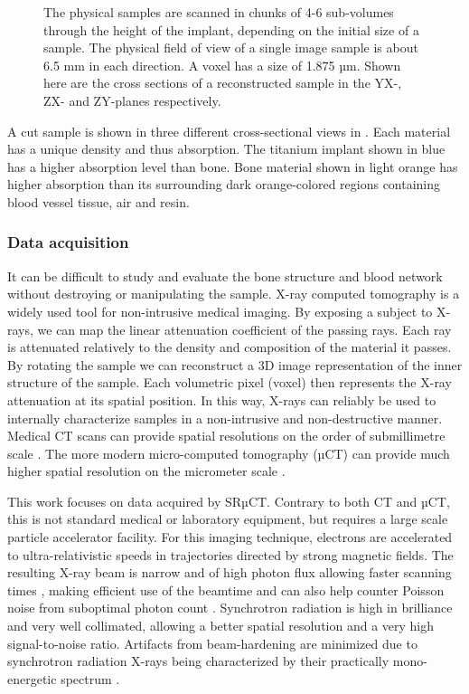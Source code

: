 \begin{figure}
\begin{tabular}{cc}
  \end{tabular}
  \caption{
	The physical samples are scanned in chunks of 4-6 sub-volumes through
	the height of the implant, depending on the initial size of a sample.
	The physical field of view of a single image sample is about 6.5 mm in
	each direction. A voxel has a size of 1.875 µm.  Shown here are the
	cross sections of a reconstructed sample in the YX-, ZX- and ZY-planes
	respectively.
  }
\label{fig:3viewsample}
\end{figure}

A cut sample is shown in three different cross-sectional views in
. Each material has a unique density and thus absorption.
The titanium implant shown in blue has a higher absorption level than bone.
Bone material shown in light orange has higher absorption than its surrounding
dark orange-colored regions containing blood vessel tissue, air and resin.

\subsubsection{Data acquisition}

It can be difficult to study and evaluate the bone structure and blood network
without destroying or manipulating the sample. X-ray computed tomography is a
widely used tool for non-intrusive medical imaging. By exposing a subject to
X-rays, we can map the linear attenuation coefficient of the passing rays. Each
ray is attenuated relatively to the density and composition of the material it
passes. By rotating the sample we can reconstruct a 3D image representation of
the inner structure of the sample. Each volumetric pixel (voxel) then
represents the X-ray attenuation at its spatial position. In this way, X-rays
can reliably be used to internally characterize samples in a non-intrusive and
non-destructive manner. Medical CT scans can provide spatial resolutions on the
order of submillimetre scale \citep{medicalct}. The more modern micro-computed
tomography (µCT) can provide much higher spatial resolution on the micrometer
scale \citep{srexptime}.

This work focuses on data acquired by SRµCT.  Contrary to both CT and µCT, this
is not standard medical or laboratory equipment, but requires a large scale
particle accelerator facility.  For this imaging technique, electrons are
accelerated to ultra-relativistic speeds in trajectories directed by strong
magnetic fields. The resulting X-ray beam is narrow and of high photon flux
allowing faster scanning times \citep{srexptime}, making efficient use of the
beamtime and can also help counter Poisson noise from suboptimal photon count
\citep{srnoise}. Synchrotron radiation is high in brilliance and very well
collimated, allowing a better spatial resolution and a very high signal-to-noise
ratio.  Artifacts from beam-hardening are minimized due to synchrotron radiation
X-rays being characterized by their practically mono-energetic spectrum
\citep{srbeamquality}.

